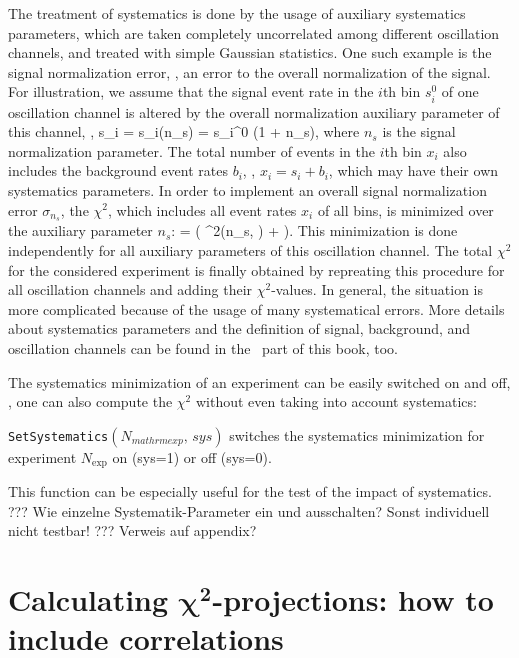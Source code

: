 The treatment of systematics is done by the usage of auxiliary systematics parameters, which are taken completely uncorrelated among different oscillation channels, and treated with simple Gaussian statistics. One such example is the signal normalization error, \ie, an error to the overall normalization of the signal. For illustration, we assume that the signal event rate in the $i$th bin $s_i^0$ of one oscillation channel is altered by the overall normalization auxiliary parameter of this channel, \ie , 
\be
 s_i = s_i(n_s) = s_i^0 \cdot (1 + n_s),
\ee
where $n_s$ is the signal normalization parameter. The total number of events in the $i$th bin $x_i$ also includes the background event rates $b_i$, \ie, $x_i = s_i + b_i$, which may have their own systematics parameters.
In order to implement an overall signal normalization error $\sigma_{n_s}$,  the $\chi^2$, which includes all event rates $x_i$ of all bins, is minimized over the auxiliary parameter $n_s$:
\be
  =  \left(  \chi^2(n_s, \hdots) +  \right).
\ee 
This minimization is done independently for all auxiliary parameters of this oscillation channel. The total $\chi^2$ for the considered experiment is finally obtained by repreating this procedure for all oscillation channels and adding their $\chi^2$-values. In general, the situation is more complicated because of the usage of many systematical errors. More details about systematics parameters and the definition of signal, background, and oscillation channels can be found in the \EDM\ part of this book, too.

The systematics minimization of an experiment can be easily switched on and off, \ie, one can also compute the $\chi^2$ without even taking into account systematics:
\begin{function}
{\tt SetSystematics}$(N_{mathrm{exp}}, \, sys)$ switches the systematics minimization for experiment $N_{\mathrm{exp}}$ on (sys=1) or off (sys=0).
\end{function}
This function can be especially useful for the test of the impact of systematics.
??? Wie einzelne Systematik-Parameter ein und ausschalten? Sonst individuell nicht testbar! ??? Verweis auf appendix? 

\chapter[Calculating $\chi^2$-projections: how to include correlations]{Calculating $\boldsymbol{\chi^2}$-projections: how to include correlations}

